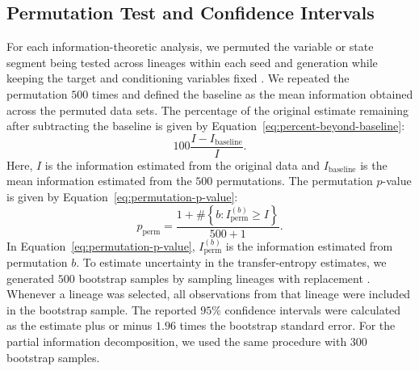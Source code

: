 \documentclass[11pt]{article}
\begin{document}
\subsection{Permutation Test and Confidence Intervals}
For each information-theoretic analysis, we permuted the variable or state segment being tested across lineages within each seed and generation while keeping the target and conditioning variables fixed \cite{theiler1992}. We repeated the permutation $500$ times and defined the baseline as the mean information obtained across the permuted data sets. The percentage of the original estimate remaining after subtracting the baseline is given by Equation~\ref{eq:percent-beyond-baseline}:
\begin{equation}
100
\frac{
I-I_{\mathrm{baseline}}
}{
I
}.
\label{eq:percent-beyond-baseline}
\end{equation}
Here, $I$ is the information estimated from the original data and $I_{\mathrm{baseline}}$ is the mean information estimated from the $500$ permutations. The permutation $p$-value is given by Equation~\ref{eq:permutation-p-value}:
\begin{equation}
p_{\mathrm{perm}}
=
\frac{
1+
\#\left\{
b:
I_{\mathrm{perm}}^{(b)}
\geq
I
\right\}
}{
500+1
}.
\label{eq:permutation-p-value}
\end{equation}
In Equation~\ref{eq:permutation-p-value}, $I_{\mathrm{perm}}^{(b)}$ is the information estimated from permutation $b$. To estimate uncertainty in the transfer-entropy estimates, we generated $500$ bootstrap samples by sampling lineages with replacement \cite{efron1993,cameron2015}. Whenever a lineage was selected, all observations from that lineage were included in the bootstrap sample. The reported $95\%$ confidence intervals were calculated as the estimate plus or minus $1.96$ times the bootstrap standard error. For the partial information decomposition, we used the same procedure with $300$ bootstrap samples.
\end{document}
